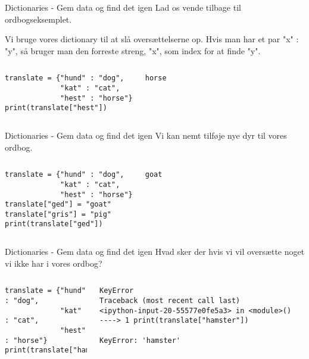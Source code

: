 \begin{frame}[fragile]{Dictionaries - Gem data og find det igen}
	Lad os vende tilbage til ordbogseksemplet.

	Vi bruge vores dictionary til at slå oversættelserne op. Hvis man har et par "x" : "y", så bruger man den forreste streng, "x", som index for at finde "y".
	\begin{columns}
		\begin{lstlisting}[style=python]
translate = {"hund" : "dog", 
             "kat" : "cat", 
             "hest" : "horse"}
print(translate["hest"])
		\end{lstlisting}
		
		\pause
		\begin{lstlisting}[style=python]
horse
		\end{lstlisting}
	\end{columns}	
\end{frame}

\begin{frame}[fragile]{Dictionaries - Gem data og find det igen}
	Vi kan nemt tilføje nye dyr til vores ordbog.
	\begin{columns}
		\column{0.5\textwidth}
		\begin{lstlisting}[style=python]
translate = {"hund" : "dog", 
             "kat" : "cat", 
             "hest" : "horse"}
translate["ged"] = "goat"
translate["gris"] = "pig"
print(translate["ged"])
		\end{lstlisting}
		
		\pause
		\column{0.3\textwidth}
		\begin{lstlisting}[style=python]
goat
		\end{lstlisting}
	\end{columns}	
\end{frame}

\begin{frame}[fragile]{Dictionaries - Gem data og find det igen}
	Hvad sker der hvis vi vil oversætte noget vi ikke har i vores ordbog?
	\begin{columns}
		\begin{lstlisting}[style=python]
translate = {"hund" : "dog", 
             "kat" : "cat", 
             "hest" : "horse"}
print(translate["hamster"])
		\end{lstlisting}
		
		\pause
		\column{0.4\textwidth}
		\begin{lstlisting}[style=python]
KeyError                                  Traceback (most recent call last)
<ipython-input-20-55577e0fe5a3> in <module>()
----> 1 print(translate["hamster"])

KeyError: 'hamster'
		\end{lstlisting}
	\end{columns}	
\end{frame}


